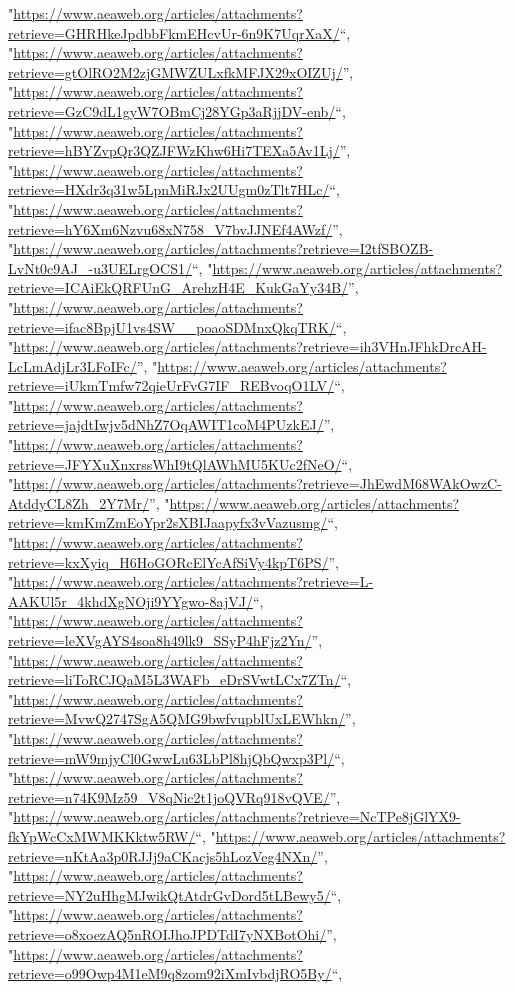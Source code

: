 \documentclass[]{article}
\begin{document}
\begin{itemize}
  "\url{https://www.aeaweb.org/articles/attachments?retrieve=GHRHkeJpdbbFkmEHcvUr-6n9K7UqrXaX/}``,
  "\url{https://www.aeaweb.org/articles/attachments?retrieve=gtOlRO2M2zjGMWZULxfkMFJX29xOIZUj/}'',
  "\url{https://www.aeaweb.org/articles/attachments?retrieve=GzC9dL1gyW7OBmCj28YGp3aRjjDV-enb/}``,
  "\url{https://www.aeaweb.org/articles/attachments?retrieve=hBYZvpQr3QZJFWzKhw6Hi7TEXa5Av1Lj/}'',
  "\url{https://www.aeaweb.org/articles/attachments?retrieve=HXdr3q31w5LpnMiRJx2UUgm0zTlt7HLc/}``,
  "\url{https://www.aeaweb.org/articles/attachments?retrieve=hY6Xm6Nzvu68xN758_V7bvJJNEf4AWzf/}'',
  "\url{https://www.aeaweb.org/articles/attachments?retrieve=I2tfSBOZB-LvNt0c9AJ_-u3UELrgOCS1/}``,
  "\url{https://www.aeaweb.org/articles/attachments?retrieve=ICAiEkQRFUnG_ArehzH4E_KukGaYy34B/}'',
  "\url{https://www.aeaweb.org/articles/attachments?retrieve=ifac8BpjU1vs4SW__poaoSDMnxQkqTRK/}``,
  "\url{https://www.aeaweb.org/articles/attachments?retrieve=ih3VHnJFhkDrcAH-LcLmAdjLr3LFoIFc/}'',
  "\url{https://www.aeaweb.org/articles/attachments?retrieve=iUkmTmfw72qieUrFvG7IF_REBvoqO1LV/}``,
  "\url{https://www.aeaweb.org/articles/attachments?retrieve=jajdtIwjv5dNhZ7OqAWIT1coM4PUzkEJ/}'',
  "\url{https://www.aeaweb.org/articles/attachments?retrieve=JFYXuXnxrssWhI9tQlAWhMU5KUc2fNeO/}``,
  "\url{https://www.aeaweb.org/articles/attachments?retrieve=JhEwdM68WAkOwzC-AtddyCL8Zh_2Y7Mr/}'',
  "\url{https://www.aeaweb.org/articles/attachments?retrieve=kmKmZmEoYpr2sXBIJaapyfx3vVazusmg/}``,
  "\url{https://www.aeaweb.org/articles/attachments?retrieve=kxXyiq_H6HoGORcElYcAfSiVy4kpT6PS/}'',
  "\url{https://www.aeaweb.org/articles/attachments?retrieve=L-AAKUl5r_4khdXgNOji9YYgwo-8ajVJ/}``,
  "\url{https://www.aeaweb.org/articles/attachments?retrieve=leXVgAYS4soa8h49lk9_SSyP4hFjz2Yn/}'',
  "\url{https://www.aeaweb.org/articles/attachments?retrieve=liToRCJQaM5L3WAFb_eDrSVwtLCx7ZTn/}``,
  "\url{https://www.aeaweb.org/articles/attachments?retrieve=MvwQ2747SgA5QMG9bwfvupblUxLEWhkn/}'',
  "\url{https://www.aeaweb.org/articles/attachments?retrieve=mW9mjyCl0GwwLu63LbPl8hjQbQwxp3Pl/}``,
  "\url{https://www.aeaweb.org/articles/attachments?retrieve=n74K9Mz59_V8qNic2t1joQVRq918vQVE/}'',
  "\url{https://www.aeaweb.org/articles/attachments?retrieve=NcTPe8jGlYX9-fkYpWcCxMWMKKktw5RW/}``,
  "\url{https://www.aeaweb.org/articles/attachments?retrieve=nKtAa3p0RJJj9aCKacjs5hLozVeg4NXn/}'',
  "\url{https://www.aeaweb.org/articles/attachments?retrieve=NY2uHhgMJwikQtAtdrGvDord5tLBewy5/}``,
  "\url{https://www.aeaweb.org/articles/attachments?retrieve=o8xoezAQ5nROIJhoJPDTdI7yNXBotOhi/}'',
  "\url{https://www.aeaweb.org/articles/attachments?retrieve=o99Owp4M1eM9q8zom92iXmIvbdjRO5By/}``,

\end{itemize}
\end{document}
